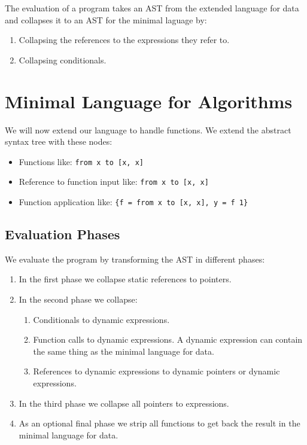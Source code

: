 \documentclass[a4paper,12pt]{article}
\begin{document}
The evaluation of a program takes an AST from the extended language for data and collapses it to an AST for the minimal laguage by:
\begin{enumerate}
\item Collapsing the references to the expressions they refer to.
\item Collapsing conditionals.
\end{enumerate}

\section{Minimal Language for Algorithms}

We will now extend our language to handle functions. We extend the abstract syntax tree with these nodes:
\begin{itemize}
\item Functions like: \lstinline|from x to [x, x]|
\item Reference to function input like: \lstinline|from x to [x, x]|
\item Function application like: \lstinline|{f = from x to [x, x], y = f 1}|
\end{itemize}

\subsection{Evaluation Phases}

We evaluate the program by transforming the AST in different phases:
\begin{enumerate}
\item In the first phase we collapse static references to pointers.
\item In the second phase we collapse:
\begin{enumerate}
\item Conditionals to dynamic expressions.
\item Function calls to dynamic expressions. A dynamic expression can contain the same thing as the minimal language for data.
\item References to dynamic expressions to dynamic pointers or dynamic expressions.
\end{enumerate}
\item In the third phase we collapse all pointers to expressions.
\item As an optional final phase we strip all functions to get back the result in the minimal language for data.
\end{enumerate}
\end{document}

